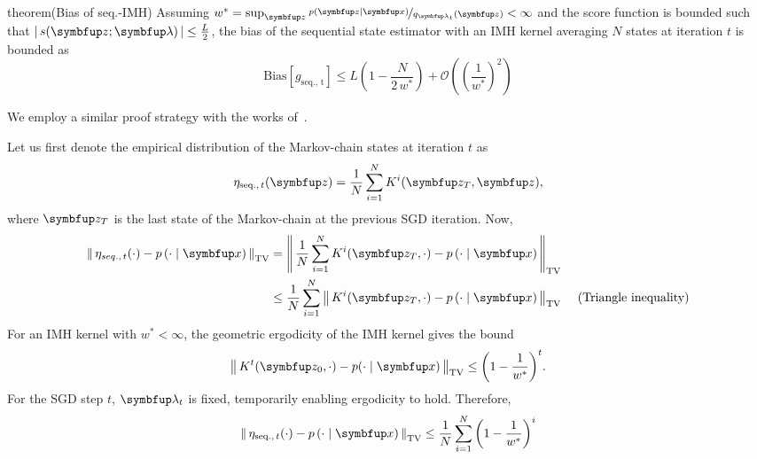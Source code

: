 
\begin{theoremEnd}{theorem}(Bias of seq.-IMH)\label{thm:bias_seq}
  Assuming \(w^* = \sup_{\vz} \nicefrac{p\left(\vz\mid\vx\right)}{q_{\vlambda_{t}}\left(\vz\right)} < \infty\) and the score function is bounded such that \(\left|\,s(\vz; \vlambda)\,\right| \leq \frac{L}{2}\), the bias of the sequential state estimator with an IMH kernel averaging \(N\) states at iteration \(t\) is bounded as
  {\small
  \[
  \mathrm{Bias}\left[ g_{\mathrm{seq.,\, t}} \right] \leq L \left( 1 - \frac{N}{2 \, w^*} \right) + \mathcal{O}\left({\left(\frac{1}{w^*}\right)}^2\right)
  \]
  }
\end{theoremEnd}
%
\begin{proofEnd}
  We employ a similar proof strategy with the works of~\citet[Theorem 4]{jiang_mcmc_2021}.

  Let us first denote the empirical distribution of the Markov-chain states at iteration \(t\) as
  \begin{align}
    \eta_{\mathrm{seq.},\, t}(\vz) = \frac{1}{N} \sum_{i=1}^N K^{i}(\vz_T, \vz),
  \end{align}
  where \(\vz_{T}\) is the last state of the Markov-chain at the previous SGD iteration.
  Now,
  \begin{align}
    \DTV{ \eta_{seq.,\, t}(\cdot) }{p\left(\cdot\mid\vx\right)}
    &= \DTV{\frac{1}{N} \sum_{i=1}^N K^{i}(\vz_T, \cdot)}{p\left(\cdot\mid\vx\right)} \\
    &\leq \frac{1}{N} \sum_{i=1}^N  \DTV{K^{i}(\vz_T, \cdot)}{p\left(\cdot\mid\vx\right)} &\text{ (Triangle inequality)}
  \end{align}
 For an IMH kernel with \(w^* < \infty\), the geometric ergodicity of the IMH kernel \citep[Theorem 2.1]{10.2307/2242610} gives the bound
 \begin{align}
   \DTV{K^t(\vz_{0}, \cdot)}{p(\cdot\mid\vx)} \leq {\left(1 - \frac{1}{w^*}\right)}^t.
 \end{align}
 For the SGD step \(t\), \(\vlambda_{t}\) is fixed, temporarily enabling ergodicity to hold.
 Therefore, 
  \begin{align}
    \DTV{ \eta_{\mathrm{seq.},\, t}(\cdot) }{p\left(\cdot\mid\vx\right)}
    &\leq \frac{1}{N} \sum_{i=1}^N {\left( 1 - \frac{1}{w^*} \right)}^i \\

\end{align}
\end{proofEnd}
